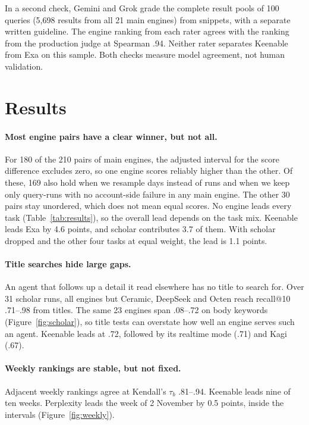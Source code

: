 \documentclass[11pt]{article}
\begin{document}
In a second check, Gemini and Grok grade the complete result pools of 100
queries (5,698 results from all 21 main engines) from snippets, with a
separate written guideline. The
engine ranking from each rater agrees with the ranking from the
production judge at Spearman .94. Neither rater separates Keenable from
Exa on this sample. Both checks measure model agreement, not human
validation.

\section{Results}
\label{sec:results}

\paragraph{Most engine pairs have a clear winner, but not all.}
For 180 of the 210 pairs of main engines, the adjusted interval for the
score difference excludes zero, so one engine scores reliably higher
than the other. Of these, 169 also hold
when we resample days instead of runs and when we keep only query-runs
with no account-side failure in any main engine. The other 30 pairs stay unordered, which does
not mean equal scores. No engine leads
every task (Table~\ref{tab:results}), so the overall lead depends on the
task mix. Keenable leads Exa by 4.6 points, and
scholar contributes 3.7 of them. With scholar dropped and the other four
tasks at equal weight, the lead is 1.1 points.

\paragraph{Title searches hide large gaps.}
An agent that follows up a detail it read elsewhere has no title to
search for. Over 31 scholar runs, all engines but Ceramic, DeepSeek and
Octen reach recall@10 .71--.98 from titles. The same 23 engines span
.08--.72 on body keywords (Figure~\ref{fig:scholar}), so title tests can overstate how well an
engine serves such an agent. Keenable leads at .72, followed by its
realtime mode (.71) and Kagi (.67).

\paragraph{Weekly rankings are stable, but not fixed.}
Adjacent weekly rankings agree at Kendall's $\tau_b$
\citep{kendall1945ties} .81--.94. Keenable leads nine of ten weeks. Perplexity
leads the week of 2 November by 0.5 points, inside the intervals
(Figure~\ref{fig:weekly}).
\end{document}
